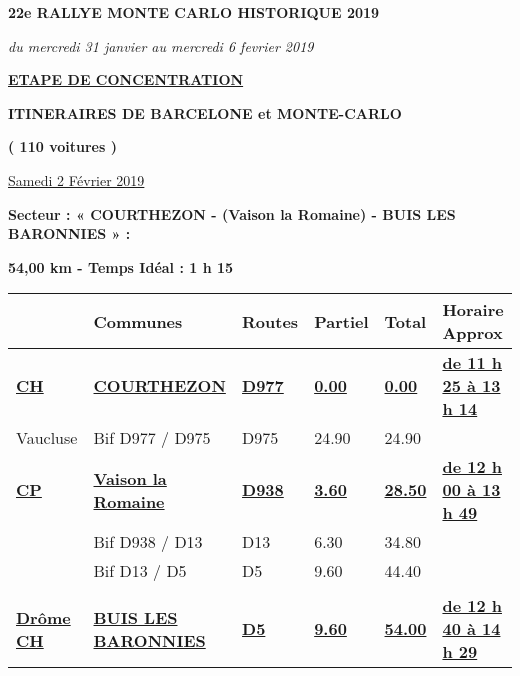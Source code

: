 \documentclass{article}%
\begin{document}
%
\normalsize%
\begin{center} \textbf{\LARGE{22e RALLYE MONTE CARLO HISTORIQUE 2019}} \end{center}%
\begin{center} \textit{du mercredi 31 janvier au mercredi 6 fevrier 2019} \end{center}%
\begin{center} \textbf{\underline{ETAPE DE CONCENTRATION}} \end{center}%
\begin{center} \textbf{ITINERAIRES DE BARCELONE et MONTE-CARLO} \end{center}%
\begin{center} \textbf{( 110 voitures )} \end{center}%
\begin{flushright} \underline{ Samedi 2 Février 2019} \end{flushright}%
\begin{flushleft} \textbf{Secteur : « COURTHEZON - (Vaison la Romaine) -  BUIS LES BARONNIES » :
} \end{flushleft}%
\begin{flushright} \textbf{54,00 km - Temps Idéal : 1 h 15
} \end{flushright}%
\begin{longtable}{p{2.25cm}|p{5.7cm}|p{3.0cm}|p{1.5cm}|p{1.5cm}|p{3.5cm}}%
\hline%
&Communes&Routes&Partiel&Total&Horaire Approx\\%
\hline%
\endhead%
\endfoot%
\endlastfoot%
\textbf{\underline{﻿CH }}&\textbf{\underline{COURTHEZON}}&\textbf{\underline{D977}}&\textbf{\underline{0.00}}&\textbf{\underline{0.00}}&\textbf{\underline{de 11 h 25 à 13 h 14}}\\%
Vaucluse&Bif D977 / D975&D975&24.90&24.90& \\%
\textbf{\underline{CP}}&\textbf{\underline{Vaison la Romaine}}&\textbf{\underline{D938}}&\textbf{\underline{3.60}}&\textbf{\underline{28.50}}&\textbf{\underline{de 12 h 00 à 13 h 49}}\\%
 &Bif D938 / D13&D13 &6.30&34.80& \\%
 &Bif D13 / D5&D5&9.60&44.40& \\%
\hline& & & & & \\%
\textbf{\underline{ Drôme     CH}}&\textbf{\underline{BUIS LES BARONNIES}}&\textbf{\underline{D5}}&\textbf{\underline{9.60}}&\textbf{\underline{54.00}}&\textbf{\underline{de 12 h 40 à 14 h 29}}\\%
\hline%
\end{longtable}%
\begin{flushleft} \textit{} \end{flushleft}%
\end{document}
